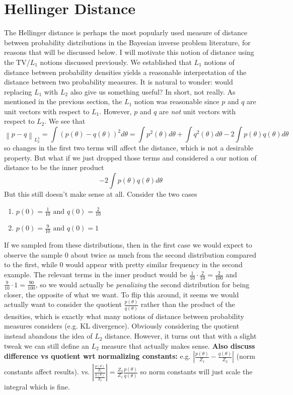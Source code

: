 \documentclass[12pt]{article}
\newcommand*{\norm}[1]{\left\lVert#1\right\rVert}
\newcommand*{\abs}[1]{\left\lvert#1\right\rvert}
\begin{document}
\section{Hellinger Distance}
The Hellinger distance is perhaps the most popularly used measure of distance between probability distributions in the Bayesian inverse problem literature, for reasons that will be discussed below. I will motivate this notion of distance using the $\text{TV}$/$L_1$ notions discussed previously. We established that $L_1$ notions of distance between probability densities yields a reasonable interpretation of the distance between two probability measures. It is natural to wonder: would replacing $L_1$ with $L_2$ also give us something useful? In short, not really. As mentioned in the previous section, the $L_1$ notion was reasonable since $p$ and $q$ are unit vectors with respect to $L_1$. However, $p$ and $q$ are \textit{not} unit vectors with respect to $L_2$. We see that 
\[\norm{p - q}_{L_2^\lambda} = \int (p(\theta) - q(\theta))^2 d\theta = \int p^2(\theta) d\theta + \int q^2(\theta) d\theta - 2\int p(\theta)q(\theta) d\theta\]
so changes in the first two terms will affect the distance, which is not a desirable property. But what if we just dropped those terms and considered a our notion of distance to be the inner product 
\[- 2\int p(\theta)q(\theta) d\theta\]
But this still doesn't make sense at all. Consider the two cases
\begin{enumerate}
\item $p(0) = \frac{1}{10} \text{ and } q(0) = \frac{2}{10}$
\item $p(0) = \frac{9}{10} \text{ and } q(0) = 1$
\end{enumerate}
If we sampled from these distributions, then in the first case we would expect to observe the sample $0$ about twice as much from the second distribution compared to the first, while $0$ would appear with pretty similar frequency in the second example. The relevant terms in the inner product would be $\frac{1}{10} \cdot \frac{2}{10} = \frac{2}{100}$ and $\frac{9}{10} \cdot 1 = \frac{90}{100}$, so we would actually be \textit{penalizing} the second distribution for being closer, the opposite of what we want. To flip this around, it seems we would actually want to consider the quotient $\frac{p(\theta)}{q(\theta)}$ rather than the product of the densities, which is exactly what many notions of distance between probability measures considers (e.g. KL divergence). Obviously considering the quotient instead abandons the idea of $L_2$ distance. However, it turns out that with a slight tweak we can still define an $L_2$ measure that actually makes sense. 
\textbf{Also discuss difference vs quotient wrt normalizing constants:} e.g. $\abs{\frac{p(\theta)}{Z_1} - \frac{q(\theta)}{Z_2}}$ (norm constants affect results). vs. 
$\abs{\frac{\frac{p(\theta)}{Z_1}}{\frac{q(\theta)}{Z_2}}} = \frac{Z_2}{Z_1} \frac{p(\theta)}{q(\theta)}$ so norm constants will just scale the integral which is fine. 
\end{document}

